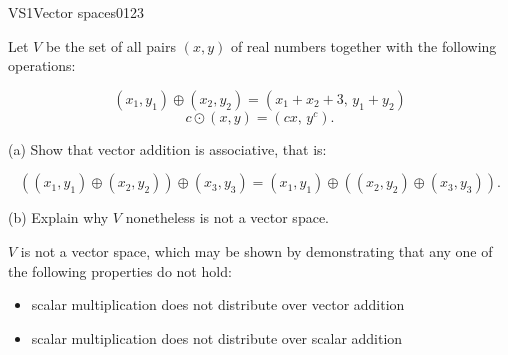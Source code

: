 \begin{exercise}{VS1}{Vector spaces}{0123} 
\begin{exerciseStatement} 

 Let \(V\) be the set of all pairs \((x,y)\) of real numbers together with the following operations: 

 \[(x_1,y_1)\oplus (x_2,y_2)=\left(x_{1} + x_{2} + 3,\,y_{1} + y_{2}\right)\]\[c \odot (x,y) =\left(c x,\,y^{c}\right).\] 

 (a) Show that vector addition is associative, that is: 

 \[
      \left((x_1,y_1)\oplus(x_2,y_2)\right)\oplus(x_3,y_3)=(x_1,y_1)\oplus\left((x_2,y_2)\oplus(x_3,y_3)\right).
    \] 

 (b) Explain why \(V\) nonetheless is not a vector space. 

 \end{exerciseStatement}
 \begin{exerciseAnswer} 

 \(V\) is not a vector space, which may be shown by demonstrating that any one of the following properties do not hold: 

 

\begin{itemize}
\item scalar multiplication does not distribute over vector addition
\item scalar multiplication does not distribute over scalar addition
\end{itemize}

     \end{exerciseAnswer}
 \end{exercise}



